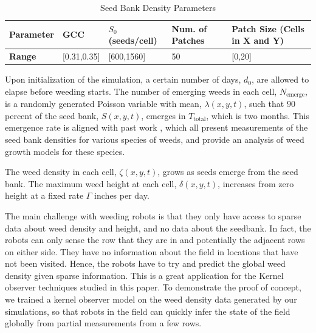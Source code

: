 \documentclass[letterpaper,12pt,peerreviewca,draftcls]{IEEEtran}
\begin{document}
\begin{table}[h]
	\centering
	\caption{Seed Bank Density Parameters} \label{tab:weedparams} 
	\begin{center}
		\begin{tabular}{ | l | l | l | l | l |}
			\hline
			\textbf{Parameter} & GCC         & $S_0$ (seeds/cell)       & Num. of Patches & Patch Size (Cells in X and Y)  \\ \hline
			\textbf{Range}     & [0.31,0.35] & [600,1560] & 50  & [0,20]  \\ \hline
		\end{tabular}
	\end{center}
\end{table}


Upon initialization of the simulation, a certain number of days, $d_0$, are allowed to elapse before weeding starts. The number of emerging weeds in each cell, $N_{{\text{emerge}}}$, is a randomly generated Poisson variable with mean, $\lambda \left( {x,y,t} \right) $, such that $90$ percent of the seed bank, $S\left( {x,y,t} \right)$, emerges in $T_\text{total}$, which is two months. This emergence rate is aligned with past work \cite{Nordby2018,schutte2014common, werle2014predicting, sellers2003comparative, horak2000growth},  which all present measurements of the seed bank densities for various species of weeds, and provide an analysis of weed growth models for these species.

The weed density in each cell, $\zeta \left( {x,y,t} \right) $, grows as seeds emerge from the seed bank. The maximum weed height at each cell, $\delta \left( {x,y,t} \right)$, increases from zero height at a fixed rate $\Gamma$ inches per day.

The main challenge with weeding robots is that they only have access to sparse data about weed density and height, and no data about the seedbank. In fact, the robots can only sense the row that they are in and potentially the adjacent rows on either side. They have no information about the field in locations that have not been visited. Hence, the robots have to try and predict the global weed density given sparse information. This is a great application for the Kernel observer techniques studied in this paper. To demonstrate the proof of concept, we trained a kernel observer model on the weed density data generated by our simulations, so that robots in the field can quickly infer the state of the field globally from partial measurements from a few rows.
\end{document}
